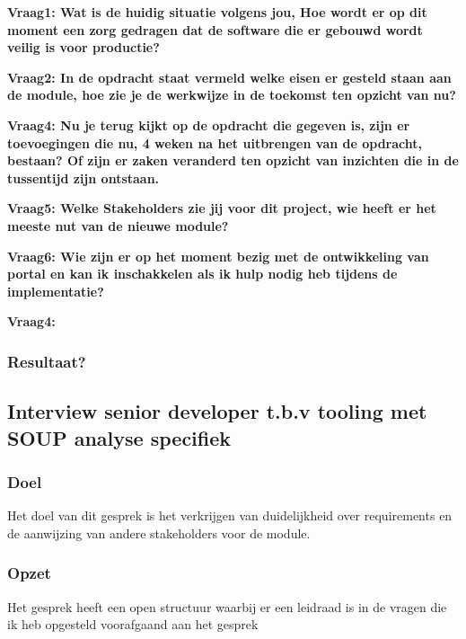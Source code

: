 \bigskip

\textbf{Vraag1: Wat is de huidig situatie volgens jou, Hoe wordt er op dit moment een zorg gedragen dat de software die er gebouwd wordt veilig is voor productie?}

\lipsum[01]
\bigskip

\textbf{Vraag2: In de opdracht staat vermeld welke eisen er gesteld staan aan de module, hoe zie je de werkwijze in de toekomst ten opzicht van nu?}

\lipsum[03]
\bigskip

\textbf{Vraag4: Nu je terug kijkt op de opdracht die gegeven is, zijn er toevoegingen die nu, 4 weken na het uitbrengen van de opdracht, bestaan? Of zijn er zaken veranderd ten opzicht van inzichten die in de tussentijd zijn ontstaan.}

\lipsum[05]
\bigskip

\textbf{Vraag5: Welke Stakeholders zie jij voor dit project, wie heeft er het meeste nut van de nieuwe module? }

\lipsum[06]
\bigskip

\textbf{Vraag6: Wie zijn er op het moment bezig met de ontwikkeling van portal en kan ik inschakkelen als ik hulp nodig heb tijdens de implementatie?}

\lipsum[09]
\bigskip

\textbf{Vraag4: }

\lipsum[07]

\subsubsection{Resultaat?}

\subsection{Interview senior developer t.b.v tooling met SOUP analyse specifiek}

\subsubsection{Doel}
Het doel van dit gesprek is het verkrijgen van duidelijkheid over requirements en de aanwijzing van andere stakeholders voor de module.

\subsubsection{Opzet}
Het gesprek heeft een open structuur waarbij er een leidraad is in de vragen die ik heb opgesteld voorafgaand aan het gesprek

